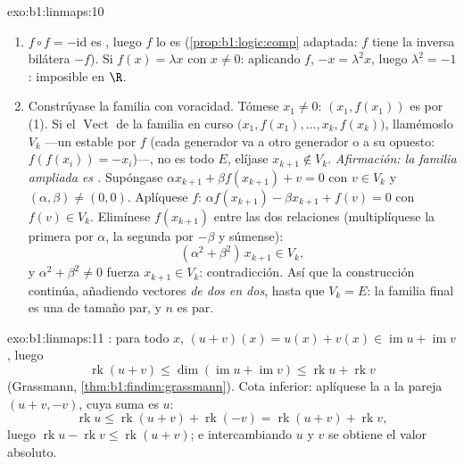 \begin{solution}{exo:b1:linmaps:10}
\begin{enumerate}
  \item $f \circ f = -\mathrm{id}$ es , luego $f$ lo es
        (\cref{prop:b1:logic:comp} adaptada: $f$ tiene la inversa
        bilátera $-f$). Si $f(x) = \lambda x$ con $x \neq 0$:
        aplicando $f$, $-x = \lambda^2 x$, luego $\lambda^2 = -1$:
        imposible en $\R$.
  \item Constrúyase la familia con voracidad. Tómese $x_1 \neq 0$:
        $(x_1, f(x_1))$ es  por (1). Si el
        $\operatorname{Vect}$ de la familia en curso
        $\bigl(x_1, f(x_1), \dots, x_k, f(x_k)\bigr)$, llamémoslo
        $V_k$ ---un  estable por $f$ (cada generador
        va a otro generador o a su opuesto:
        $f(f(x_i)) = -x_i$)---, no es todo $E$, elíjase
        $x_{k+1} \notin V_k$. \emph{Afirmación: la familia ampliada
        es .} Supóngase
        $\alpha x_{k+1} + \beta f(x_{k+1}) + v = 0$ con $v \in V_k$ y
        $(\alpha, \beta) \neq (0,0)$. Aplíquese $f$:
        $\alpha f(x_{k+1}) - \beta x_{k+1} + f(v) = 0$ con
        $f(v) \in V_k$. Elimínese $f(x_{k+1})$ entre las dos
        relaciones (multiplíquese la primera por $\alpha$, la segunda
        por $-\beta$ y súmense):
        \[
        (\alpha^2 + \beta^2)\, x_{k+1} \in V_k ,
        \]
        y $\alpha^2 + \beta^2 \neq 0$ fuerza $x_{k+1} \in V_k$:
        contradicción. Así que la construcción continúa, añadiendo
        vectores \emph{de dos en dos}, hasta que $V_k = E$: la
        familia final es una  de tamaño par, y $n$ es par.
\end{enumerate}
\end{solution}

\begin{solution}{exo:b1:linmaps:11}
: para todo $x$,
$(u + v)(x) = u(x) + v(x) \in \operatorname{im} u +
\operatorname{im} v$, luego
\[
\operatorname{rk}(u + v)
\leq \dim(\operatorname{im} u + \operatorname{im} v)
\leq \operatorname{rk} u + \operatorname{rk} v
\]
(Grassmann, \cref{thm:b1:findim:grassmann}). Cota inferior:
aplíquese la  a la pareja $(u + v, -v)$, cuya suma es $u$:
\[
\operatorname{rk} u \leq \operatorname{rk}(u + v) +
\operatorname{rk}(-v) = \operatorname{rk}(u + v) +
\operatorname{rk} v,
\]
luego $\operatorname{rk} u - \operatorname{rk} v \leq
\operatorname{rk}(u+v)$; e intercambiando $u$ y $v$ se obtiene el
valor absoluto.
\end{solution}

